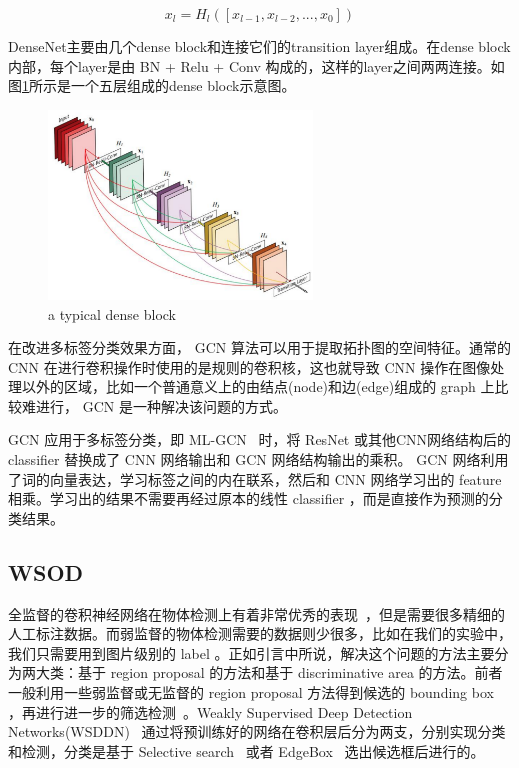 \documentclass[a4paper]{ctexart}
\begin{document}
\begin{equation}
    x_l = H_l([x_{l-1}, x_{l-2},..., x_{0}])
\end{equation}

DenseNet主要由几个dense block和连接它们的transition layer组成。在dense block内部，每个layer是由 BN + Relu + Conv 构成的，这样的layer之间两两连接。如图\ref{fig:dense block}所示是一个五层组成的dense block示意图。

	\begin{figure}[t]
		\small
		\centering
		\includegraphics[width=7cm]{denseblock.png}
		\caption{a typical dense block}
		\label{fig:dense block}
	\end{figure}

在改进多标签分类效果方面， GCN 算法可以用于提取拓扑图的空间特征。通常的 CNN 在进行卷积操作时使用的是规则的卷积核，这也就导致 CNN 操作在图像处理以外的区域，比如一个普通意义上的由结点(node)和边(edge)组成的 graph 上比较难进行， GCN 是一种解决该问题的方式。

 GCN 应用于多标签分类，即 ML-GCN ~\cite{ML_GCN_CVPR_2019}时，将 ResNet 或其他CNN网络结构后的 classifier 替换成了 CNN 网络输出和 GCN 网络结构输出的乘积。 GCN 网络利用了词的向量表达，学习标签之间的内在联系，然后和 CNN 网络学习出的 feature 相乘。学习出的结果不需要再经过原本的线性 classifier ，而是直接作为预测的分类结果。



\subsection{WSOD}
全监督的卷积神经网络在物体检测上有着非常优秀的表现~\cite{ren2015faster, redmon2016you}，但是需要很多精细的人工标注数据。而弱监督的物体检测需要的数据则少很多，比如在我们的实验中，我们只需要用到图片级别的 label 。正如引言中所说，解决这个问题的方法主要分为两大类：基于 region proposal 的方法和基于 discriminative area 的方法。前者一般利用一些弱监督或无监督的 region proposal 方法得到候选的 bounding box ，再进行进一步的筛选检测~\cite{bilen2016weakly, diba2017weakly, tang2018pcl}。Weakly Supervised Deep Detection Networks(WSDDN)~\cite{bilen2016weakly} 通过将预训练好的网络在卷积层后分为两支，分别实现分类和检测，分类是基于 Selective search~\cite{uijlings2013selective} 或者 EdgeBox~\cite{zitnick2014edge} 选出候选框后进行的。
\end{document}
